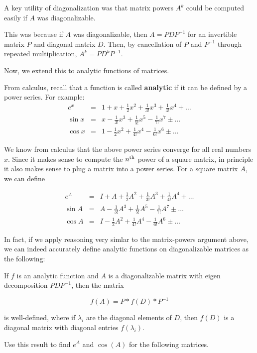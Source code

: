 \documentclass{ximera}
\author{Zack Reed}
\begin{document}
A key utility of diagonalization was that matrix powers $A^k$ could be computed easily if $A$ was diagonalizable.

This was because if $A$ was diagonalizable, then $A=PDP^{-1}$ for an invertible matrix $P$ and diagonal matrix $D$. Then, by cancellation of $P$ and $P^{-1}$ through repeated multiplication, $A^k=PD^kP^{-1}$.

Now, we extend this to analytic functions of matrices. 

From calculus, recall that a function is called \textbf{analytic} if it can be defined by a power series. For example:
\begin{eqnarray*}
  e^{x} &=& 1 + x + \frac{1}{2}x^2 + \frac{1}{3!}x^3 + \frac{1}{4!}x^4 + \ldots \\
  \sin x &=& x - \frac{1}{3!}x^3 + \frac{1}{5!}x^5 - \frac{1}{7!}x^7 \pm \ldots \\
  \cos x &=& 1 - \frac{1}{2}x^2 + \frac{1}{4!}x^4 - \frac{1}{6!}x^6 \pm \ldots
\end{eqnarray*}

We know from calculus that the above power series converge for all
real numbers $x$. Since it makes sense to compute the $n^{\text{th}}$ power of
a square matrix, in principle it also makes sense to plug a matrix
into a power series. For a square matrix $A$, we can define

\begin{eqnarray*}
  e^{A} &=& I + A + \frac{1}{2}A^2 + \frac{1}{3!}A^3 + \frac{1}{4!}A^4 + \ldots \\
  \sin A &=& A - \frac{1}{3!}A^3 + \frac{1}{5!}A^5 - \frac{1}{7!}A^7 \pm \ldots \\
  \cos A &=& I - \frac{1}{2}A^2 + \frac{1}{4!}A^4 - \frac{1}{6!}A^6 \pm \ldots
\end{eqnarray*}

In fact, if we apply reasoning very simlar to the matrix-powers argument above, we can indeed accurately define analytic functions on diagonalizable matrices as the following:

If $f$ is an analytic function and $A$ is a diagonalizable matrix with eigen decomposition $PDP^{-1}$, then the matrix 

$$f(A)=P*f(D)*P^{-1}$$

is well-defined, where if $\lambda_i$ are the diagonal elements of $D$, then $f(D)$ is a diagonal matrix with diagonal entries $f(\lambda_i)$.

Use this result to find $e^A$ and $\cos(A)$ for the following matrices. 
\end{document}
